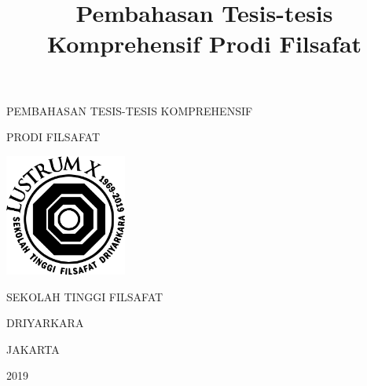 \documentclass[10pt,a4paper]{article}
\title{Pembahasan Tesis-tesis Komprehensif Prodi Filsafat}
\begin{document}
\begin{titlepage}
	\begin{center}
    \vfill
		{\lsstyle\Huge PEMBAHASAN TESIS-TESIS KOMPREHENSIF\par}
    \vfill
    {\lsstyle\LARGE PRODI FILSAFAT\par}
    \vfill
    \includegraphics[width=4cm,height=4cm]{logo-stfd-lustrum.png}
    \vfill
    {\lsstyle\Large SEKOLAH TINGGI FILSAFAT\par}
    {\lsstyle\Large DRIYARKARA\par}
    \vfill
    {\lsstyle\Large JAKARTA\par}
		{\Large 2019\par}
\end{center}
\end{titlepage}

\end{document}
